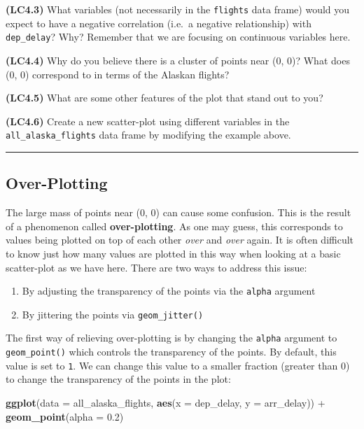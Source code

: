\documentclass[]{tufte-book}
\newenvironment{Shaded}{\begin{snugshade}}{\end{snugshade}}
\newcommand{\KeywordTok}[1]{\textcolor[rgb]{0.13,0.29,0.53}{\textbf{{#1}}}}
\newcommand{\DataTypeTok}[1]{\textcolor[rgb]{0.13,0.29,0.53}{{#1}}}
\newcommand{\FloatTok}[1]{\textcolor[rgb]{0.00,0.00,0.81}{{#1}}}
\newcommand{\StringTok}[1]{\textcolor[rgb]{0.31,0.60,0.02}{{#1}}}
\newcommand{\NormalTok}[1]{{#1}}
\let\oldrule=\rule
\renewcommand{\rule}[1]{\oldrule{\linewidth}}
\providecommand{\tightlist}{%
  \setlength{\itemsep}{0pt}\setlength{\parskip}{0pt}}
\begin{document}
\textbf{(LC4.3)} What variables (not necessarily in the \texttt{flights}
data frame) would you expect to have a negative correlation (i.e.~a
negative relationship) with \texttt{dep\_delay}? Why? Remember that we
are focusing on continuous variables here.

\textbf{(LC4.4)} Why do you believe there is a cluster of points near
(0, 0)? What does (0, 0) correspond to in terms of the Alaskan flights?

\textbf{(LC4.5)} What are some other features of the plot that stand out
to you?

\textbf{(LC4.6)} Create a new scatter-plot using different variables in
the \texttt{all\_alaska\_flights} data frame by modifying the example
above.

\begin{center}\rule{0.5\linewidth}{\linethickness}\end{center}

\subsection{Over-Plotting}\label{over-plotting}

The large mass of points near (0, 0) can cause some confusion. This is
the result of a phenomenon called \textbf{over-plotting}. As one may
guess, this corresponds to values being plotted on top of each other
\emph{over} and \emph{over} again. It is often difficult to know just
how many values are plotted in this way when looking at a basic
scatter-plot as we have here. There are two ways to address this issue:

\begin{enumerate}
\def\labelenumi{\arabic{enumi}.}
\tightlist
\item
  By adjusting the transparency of the points via the \texttt{alpha}
  argument
\item
  By jittering the points via \texttt{geom\_jitter()}
\end{enumerate}

The first way of relieving over-plotting is by changing the
\texttt{alpha} argument to \texttt{geom\_point()} which controls the
transparency of the points. By default, this value is set to \texttt{1}.
We can change this value to a smaller fraction (greater than 0) to
change the transparency of the points in the plot:

\begin{Shaded}
\begin{Highlighting}[]
\KeywordTok{ggplot}\NormalTok{(}\DataTypeTok{data =} \NormalTok{all_alaska_flights, }\KeywordTok{aes}\NormalTok{(}\DataTypeTok{x =} \NormalTok{dep_delay, }\DataTypeTok{y =} \NormalTok{arr_delay)) +}\StringTok{ }
\StringTok{  }\KeywordTok{geom_point}\NormalTok{(}\DataTypeTok{alpha =} \FloatTok{0.2}\NormalTok{)}
\end{Highlighting}
\end{Shaded}
\end{document}
